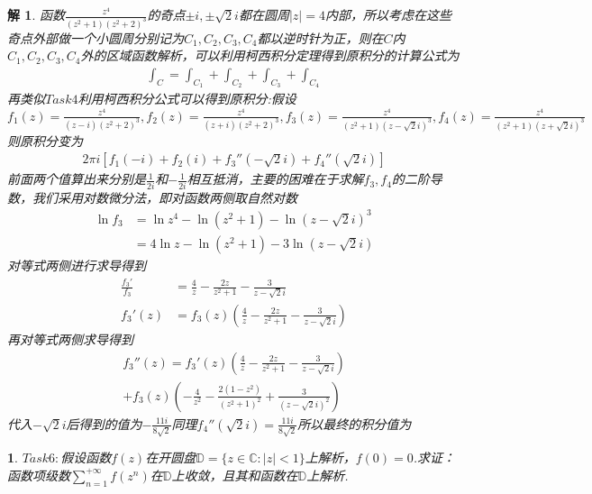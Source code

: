 \documentclass{ctexart}
\newcommand{\。}{．} %
\newenvironment{lanse}{
    \begin{tcolorbox}[breakable,enhanced, colback=qlan, boxrule=0pt, frame hidden,
        borderline west={0.7mm}{0.1mm}{slan}]
    }
    {\end{tcolorbox}}
\newenvironment{zise}{
    \begin{tcolorbox}[breakable,enhanced, colback=qzi, boxrule=0pt, frame hidden,
        borderline west={0.7mm}{0.1mm}{szi}]
    }
    {\end{tcolorbox}}
\theoremstyle{t} %
\newtheorem*{tmhj}{\color{slan} 解}
\newtheorem*{smhj}{\color{slan} }
\newenvironment{tm}{\begin{lanse}\begin{tmhj}}{\end{tmhj}\end{lanse}}
\newenvironment{sm}{\begin{zise}\begin{smhj}}{\end{smhj}\end{zise}}
\begin{document}
\begin{tm}
函数$\frac{z^4}{(z^2+1)(z^2+2)^3}$的奇点$\pm i,\pm\sqrt{2}i$都在圆周$|z|=4$内部，所以考虑在这些奇点外部做一个小圆周分别记为$C_1,C_2,C_3,C_4$都以逆时针为正，则在$C$内$C_1,C_2,C_3,C_4$外的区域函数解析，可以利用柯西积分定理得到原积分的计算公式为
\begin{align*}
    \int_{C}=\int_{C_1}+\int_{C_2}+\int_{C_3}+\int_{C_4}
\end{align*}
再类似$Task4$利用柯西积分公式可以得到原积分:假设$f_1(z)=\frac{z^4}{(z-i)(z^2+2)^3},f_2(z)=\frac{z^4}{(z+i)(z^2+2)^3},f_3(z)=\frac{z^4}{(z^2+1)(z-\sqrt{2}i)^3},f_4(z)=\frac{z^4}{(z^2+1)(z+\sqrt{2}i)^3}$
则原积分变为\begin{align*}
    2\pi i [f_1(-i)+f_2(i)+f_3''(-\sqrt{2}i)+f_4''(\sqrt{2}i)]
\end{align*}
前面两个值算出来分别是$\frac{1}{2i}$和$-\frac{1}{2i}$相互抵消，主要的困难在于求解$f_3,f_4$的二阶导数，我们采用对数微分法，即对函数两侧取自然对数
\begin{align*}
    \ln f_3&=\ln z^4-\ln (z^2+1)-\ln (z-\sqrt{2}i)^3\\
    &=4\ln z-\ln (z^2+1)-3\ln(z-\sqrt{2}i)
\end{align*}
对等式两侧进行求导得到
\begin{align*}
    \frac{f_3'}{f_3}&=\frac{4}{z}-\frac{2z}{z^2+1}-\frac{3}{z-\sqrt{2}i}\\
    f_3'(z)&=f_3(z)\left(\frac{4}{z}-\frac{2z}{z^2+1}-\frac{3}{z-\sqrt{2}i}\right)
\end{align*}
再对等式两侧求导得到
\begin{align*}
    f_3''(z)=f_3'(z)\left(\frac{4}{z}-\frac{2z}{z^2+1}-\frac{3}{z-\sqrt{2}i}\right)\\+f_3(z)\left(-\frac{4}{z^2}-\frac{2(1-z^2)}{(z^2+1)^2}+\frac{3}{(z-\sqrt{2}i)^2}\right)
\end{align*}
代入$-\sqrt{2}i$后得到的值为$-\frac{11i}{8\sqrt{2}}$同理$f_4''(\sqrt{2}i)=\frac{11i}{8\sqrt{2}}$所以最终的积分值为
\end{tm}
\begin{sm}
    $Task6:$假设函数$f(z)$在开圆盘$\mathbb{D}=\{z\in\mathbb{C}:|z|<1\}$上解析，$f(0)=0$.求证：函数项级数$\sum_{n=1}^{+\infty}f(z^n)$在$\mathbb{D}$上收敛，且其和函数在$\mathbb{D}$上解析.
\end{sm}
\end{document}
